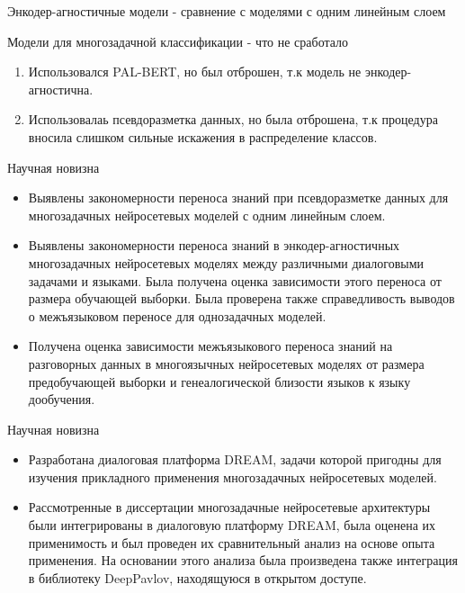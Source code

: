\begin{frame}{Энкодер-агностичные модели - сравнение с моделями с одним линейным слоем}
\begin{frame}{Модели для многозадачной классификации - что не сработало}
\begin{enumerate}
\item Использовался PAL-BERT, но был отброшен, т.к модель не энкодер-агностична.
\item Использовалаь псевдоразметка данных, но была отброшена, т.к процедура вносила слишком сильные искажения в распределение классов.
\end{enumerate}
\end{frame}


\begin{frame}{Научная новизна}
\begin{itemize}
  \item {Выявлены закономерности переноса знаний при псевдоразметке данных для многозадачных нейросетевых моделей с одним линейным слоем.}
  \item {Выявлены закономерности переноса знаний в энкодер-агностичных многозадачных нейросетевых моделях между различными диалоговыми задачами и языками. Была получена оценка зависимости этого переноса от размера обучающей выборки. Была проверена также справедливость выводов о межъязыковом переносе для однозадачных моделей.}
  \item {Получена оценка зависимости межъязыкового переноса знаний на разговорных данных в многоязычных нейросетевых моделях от размера предобучающей выборки и генеалогической близости языков к языку дообучения.}
\end{itemize}    
\end{frame}

\begin{frame}{Научная новизна}
\begin{itemize}
  \item {Разработана диалоговая платформа DREAM, задачи которой пригодны для изучения прикладного применения многозадачных нейросетевых моделей.}
  \item {Рассмотренные в диссертации многозадачные нейросетевые архитектуры были интегрированы в диалоговую платформу DREAM, была оценена их применимость и был проведен их сравнительный анализ на основе опыта применения. На основании этого анализа была произведена также интеграция в библиотеку DeepPavlov, находящуюся в открытом доступе.}
\end{itemize}    
\end{frame}





\end{frame}
